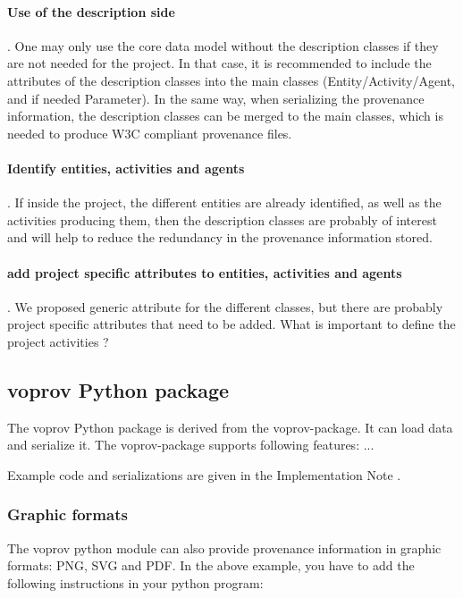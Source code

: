\paragraph{Use of the description side}. 
One may only use the core data model without the description classes if they are not needed for the project. In that case, it is recommended to include the attributes of the description classes into the main classes (Entity/Activity/Agent, and if needed Parameter). In the same way, when serializing the provenance information, the description classes can be merged to the main classes, which is needed to produce W3C compliant provenance files.

\paragraph{Identify entities, activities and agents}.
If inside the project, the different entities are already identified, as well as the activities producing them, then the description classes are probably of interest and will help to reduce the redundancy in the provenance information stored.

\paragraph{add project specific attributes to entities, activities and agents}.
We proposed generic attribute for the different classes, but there are probably project specific attributes that need to be added. What is important to define the project activities ? 



\subsection{voprov Python package}\label{sec:implementation_voprov}
The voprov Python package is derived from the voprov-package. It can load
data and serialize it. The voprov-package supports following features:
...

Example code and serializations are given in the Implementation Note \citep{std:ProvenanceImplementationNote}.


\subsubsection{Graphic formats}
\label{sec:graphic_formats}
The voprov python module can also provide provenance information in graphic formats: PNG, SVG and PDF.
In the above example, you have to add the following instructions in your python program:

